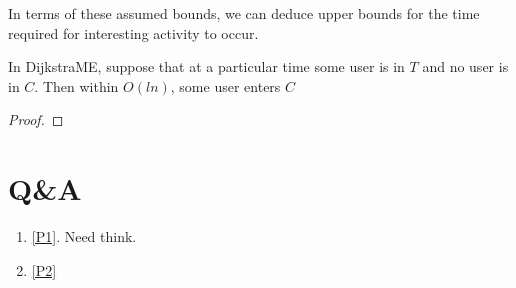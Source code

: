 \documentclass[11pt]{article}
\begin{document}
In terms of these assumed bounds, we can deduce upper bounds for the time required for interesting
activity to occur. 

\begin{theorem}[]
In DijkstraME, suppose that at a particular time some user is in \(T\) and no user is in \(C\). Then
within \(O(ln)\), some user enters \(C\)
\end{theorem}

\begin{proof}

\end{proof}
\section{Q\&A}
\label{sec:org2a0f785}
\begin{enumerate}
\item \ref{P1}. Need think.
\item \ref{P2}
\end{enumerate}
\end{document}

